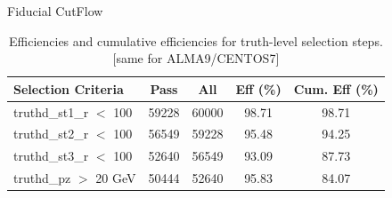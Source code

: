 \begin{frame}{Fiducial CutFlow}
    \begin{table}[h!]
        \centering
        \small
        \begin{tabular}{lcccc}
            \toprule
            \textbf{Selection Criteria} & \textbf{Pass} & \textbf{All} & \textbf{Eff (\%)} & \textbf{Cum. Eff (\%)} \\
            \midrule
            truthd\_st1\_r $<$ 100    & 59228 & 60000 & 98.71  & 98.71 \\
            truthd\_st2\_r $<$ 100    & 56549 & 59228 & 95.48  & 94.25 \\
            truthd\_st3\_r $<$ 100    & 52640 & 56549 & 93.09  & 87.73 \\
            truthd\_pz $>$ 20 GeV       & 50444 & 52640 & 95.83  & 84.07 \\

            \bottomrule
        \end{tabular}
        
        \caption{Efficiencies and cumulative efficiencies for truth-level selection steps. [same for ALMA9/CENTOS7]}
        \label{table:truth_efficiency}
    \end{table}
\end{frame}

